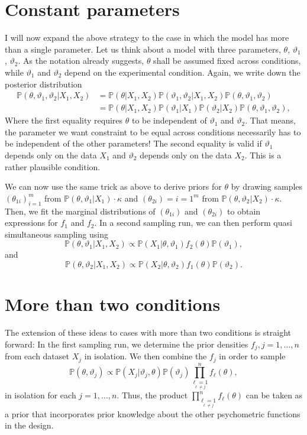 \documentclass[a4paper,11pt]{scrartcl}
\def\prob{\mathbb{P}}
\begin{document}
\section{Constant parameters}

I will now expand the above strategy to the case in which the model has more than a single parameter.
Let us think about a model with three parameters, $\theta$, $\vartheta_1$, $\vartheta_2$.
As the notation already suggests,  $\theta$ shall be assumed fixed across conditions, while $\vartheta_1$ and $\vartheta_2$ depend on the
experimental condition.
Again, we write down the posterior distribution
%
\begin{align*}
\prob(\theta,\vartheta_1,\vartheta_2|X_1,X_2) &=\prob(\theta|X_1,X_2)\prob(\vartheta_1,\vartheta_2|X_1,X_2)\prob(\theta,\vartheta_1,\vartheta_2) \\
&= \prob(\theta|X_1,X_2)\prob(\vartheta_1|X_1)\prob(\vartheta_2|X_2)\prob(\theta,\vartheta_1,\vartheta_2),
\end{align*}
%
Where the first equality requires $\theta$ to be independent of $\vartheta_1$ and $\vartheta_2$.
That means, the parameter we want constraint to be equal across conditions necessarily has to be independent of the other parameters!
The second equality is valid if $\vartheta_1$ depends only on the data $X_1$ and $\vartheta_2$ depends only on the data $X_2$.
This is a rather plausible condition.

We can now use the same trick as above to derive priors for $\theta$ by drawing samples $(\theta_{1i})_{i=1}^m$ from $\prob(\theta,\vartheta_1|X_1)\cdot\kappa$
and $(\theta_{2i})={i=1}^m$ from $\prob(\theta,\vartheta_2|X_2)\cdot\kappa$.
Then, we fit the marginal distributions of $(\theta_{1i})$ and $(\theta_{2i})$ to obtain expressions for $f_1$ and $f_2$.
In a second sampling run, we can then perform quasi simultaneous sampling using
%
$$
\prob(\theta,\vartheta_1|X_1,X_2) \propto\prob(X_1|\theta,\vartheta_1)f_2(\theta)\prob(\vartheta_1),
$$
%
and
%
$$
\prob(\theta,\vartheta_2|X_1,X_2) \propto\prob(X_2|\theta,\vartheta_2)f_1(\theta)\prob(\vartheta_2).
$$
%

\section{More than two conditions}

The extension of these ideas to cases with more than two conditions is straight forward:
In the first sampling run, we determine the prior densities $f_j, j=1,\dots,n$ from each dataset $X_j$ in isolation.
We then combine the $f_j$ in order to sample
%
\begin{equation}
    \label{eq:allcombined}
\prob(\theta,\vartheta_j) \propto\prob(X_j|\vartheta_j,\theta) \prob(\vartheta_j) \prod_{\underset{\ell\neq j}{\ell=1}}^n f_\ell ( \theta ),
\end{equation}
%
in isolation for each $j=1,\dots,n$.
Thus, the product $\prod_{\underset{\ell\neq j}{\ell=1}}^n f_\ell ( \theta )$ can be taken as a prior that incorporates prior knowledge about the other psychometric functions in the design.
\end{document}
